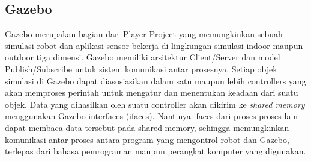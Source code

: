 \subsection{Gazebo}

Gazebo \citep{Koenig2004} merupakan bagian dari Player Project \citep{Gerkey2003} yang memungkinkan sebuah simulasi robot dan aplikasi sensor bekerja di lingkungan simulasi indoor maupun outdoor tiga dimensi.
Gazebo memiliki arsitektur Client/Server dan model Publish/Subscribe untuk sistem komunikasi antar prosesnya.
Setiap objek simulasi di Gazebo dapat diasosiasikan dalam satu maupun lebih controllers yang akan memproses perintah untuk mengatur dan menentukan keadaan dari suatu objek.
Data yang dihasilkan oleh suatu controller akan dikirim ke \emph{shared memory} menggunakan Gazebo interfaces (ifaces).
Nantinya ifaces dari proses-proses lain dapat membaca data tersebut pada shared memory, sehingga memungkinkan komunikasi antar proses antara program yang mengontrol robot dan Gazebo, terlepas dari bahasa pemrograman maupun perangkat komputer yang digunakan.

